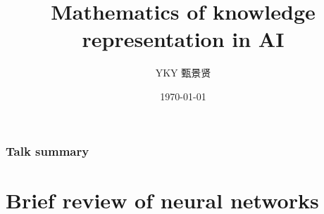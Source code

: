 \documentclass{beamer}
\title[Knowledge representation in AI]{Mathematics of knowledge representation in AI} %
\author{YKY 甄景贤} %
\institute[] %
{
Independent researcher, Hong Kong \\ %
\medskip
\textit{generic.intelligence@gmail.com} %
}
\date{\today} %
\begin{document}
\frame{\titlepage}

\begin{frame}
\frametitle{Talk summary}
\tableofcontents
\end{frame}

%
%




\section{Brief review of neural networks}
\end{document}
